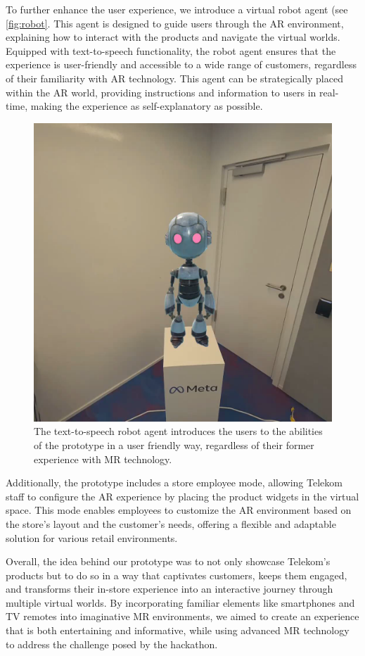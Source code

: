 \documentclass[12pt]{article}
\begin{document}
To further enhance the user experience, we introduce a virtual robot agent (see \autoref{fig:robot}. This agent is designed to guide users through the AR environment, explaining how to interact with the products and navigate the virtual worlds. Equipped with text-to-speech functionality, the robot agent ensures that the experience is user-friendly and accessible to a wide range of customers, regardless of their familiarity with AR technology. This agent can be strategically placed within the AR world, providing instructions and information to users in real-time, making the experience as self-explanatory as possible.

\begin{figure}[ht]
    \centering
    \includegraphics[width=0.5\linewidth]{images/robot.png}
    \caption{The text-to-speech robot agent introduces the users to the abilities of the prototype in a user friendly way, regardless of their former experience with MR technology.}
    \label{fig:robot}
\end{figure}

Additionally, the prototype includes a store employee mode, allowing Telekom staff to configure the AR experience by placing the product widgets in the virtual space. This mode enables employees to customize the AR environment based on the store’s layout and the customer’s needs, offering a flexible and adaptable solution for various retail environments.

Overall, the idea behind our prototype was to not only showcase Telekom’s products but to do so in a way that captivates customers, keeps them engaged, and transforms their in-store experience into an interactive journey through multiple virtual worlds. By incorporating familiar elements like smartphones and TV remotes into imaginative MR environments, we aimed to create an experience that is both entertaining and informative, while using advanced MR technology to address the challenge posed by the hackathon.
\end{document}
